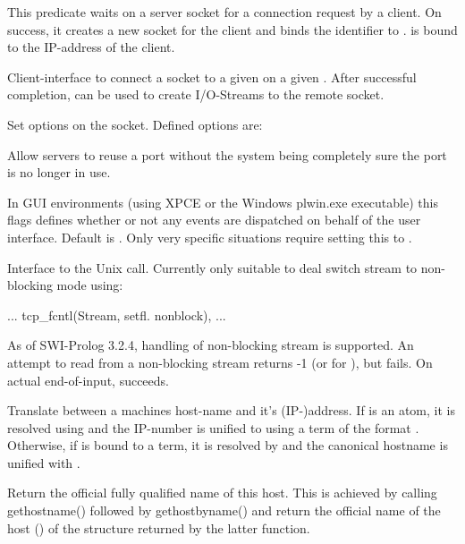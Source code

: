 \documentclass[11pt]{article}
\begin{document}
\begin{description}
This predicate waits on a server socket for a connection request by
a client.  On success, it creates a new socket for the client and
binds the identifier to .    is bound to the
IP-address of the client.

Client-interface to connect a socket to a given  on a given
.  After successful completion,  can be used to
create I/O-Streams to the remote socket.

Set options on the socket.  Defined options are:

\begin{description}
Allow servers to reuse a port without the system being completely sure
the port is no longer in use.

In GUI environments (using XPCE or the Windows plwin.exe executable)
this flags defines whether or not any events are dispatched on behalf of
the user interface. Default is . Only very specific
situations require setting this to .
\end{description}

Interface to the Unix  call.  Currently only suitable
to deal switch stream to non-blocking mode using:

\begin{code}
        ...
        tcp_fcntl(Stream, setfl. nonblock),
        ...
\end{code}

\noindent
As of SWI-Prolog 3.2.4, handling of non-blocking stream is supported. An
attempt to read from a non-blocking stream returns -1 (or
 for ), but  fails. On actual
end-of-input,  succeeds.

Translate between a machines host-name and it's (IP-)address. If
 is an atom, it is resolved using
 and the IP-number is unified to 
using a term of the format .
Otherwise, if  is bound to a  term, it
is resolved by  and the canonical hostname
is unified with .

Return the official fully qualified name of this host.  This is achieved
by calling gethostname() followed by gethostbyname() and return the 
official name of the host () of the structure returned
by the latter function.
\end{description}
\end{document}
